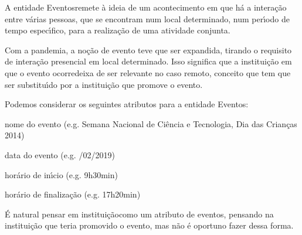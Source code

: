 \documentclass[
12pt,		%
openright,	%
twoside,  %
a4paper,			%
chapter=TITLE,		%
english,			%
french,				%
spanish,			%
brazil				%
]{USPSC-classe/USPSC}
\begin{document}
\noindent\begin{center}\mbox{\centering{}}\end{center}


A entidade \textquotedbl Eventos\textquotedbl  remete \`a ideia de um acontecimento em que h\'a a intera\c{c}\~ao entre v\'arias pessoas, que se encontram num local determinado, num per\'{\i}odo de tempo espec\'{\i}fico, para a realiza\c{c}\~ao de uma atividade conjunta.









Com a pandemia, a no\c{c}\~ao de evento teve que ser expandida, tirando o requisito de intera\c{c}\~ao presencial em local determinado. Isso significa que \textquotedbl a institui\c{c}\~ao em que o evento ocorre\textquotedbl  deixa de ser relevante no caso remoto, conceito que tem que ser substitu\'{\i}do por \textquotedbl a institui\c{c}\~ao que promove o evento\textquotedbl .









Podemos considerar os seguintes atributos para a entidade \textquotedbl Eventos\textquotedbl :










\begin{alineas}
\item nome do evento (e.g. \textquotedbl Semana Nacional de Ci\^encia e Tecnologia\textquotedbl , \textquotedbl Dia das Crian\c{c}as 2014\textquotedbl )
\item data do evento (e.g. /02/2019\textquotedbl )
\item hor\'ario de in\'{\i}cio (e.g. \textquotedbl 9h30min\textquotedbl )
\item hor\'ario de finaliza\c{c}\~ao (e.g. \textquotedbl 17h20min\textquotedbl )
\end{alineas}

\'E natural pensar em \textquotedbl institui\c{c}\~ao\textquotedbl  como um atributo de eventos, pensando na institui\c{c}\~ao que teria promovido o evento, mas n\~ao \'e oportuno fazer dessa forma.
\end{document}
